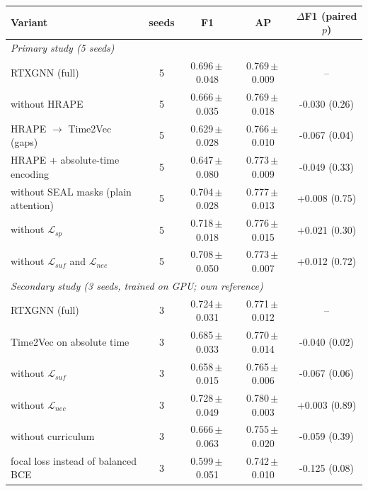 \begin{tabular}{lcccc}
\toprule
Variant & seeds & F1 & AP & $\Delta$F1 (paired $p$)\\
\midrule
\multicolumn{5}{l}{\textit{Primary study (5 seeds)}}\\
RTXGNN (full) & 5 & 0.696\,$\pm$\,0.048 & 0.769\,$\pm$\,0.009 & --\\
without HRAPE & 5 & 0.666\,$\pm$\,0.035 & 0.769\,$\pm$\,0.018 & -0.030 (0.26)\\
HRAPE $\rightarrow$ Time2Vec (gaps) & 5 & 0.629\,$\pm$\,0.028 & 0.766\,$\pm$\,0.010 & -0.067 (0.04)\\
HRAPE + absolute-time encoding & 5 & 0.647\,$\pm$\,0.080 & 0.773\,$\pm$\,0.009 & -0.049 (0.33)\\
without SEAL masks (plain attention) & 5 & 0.704\,$\pm$\,0.028 & 0.777\,$\pm$\,0.013 & +0.008 (0.75)\\
without $\mathcal{L}_{sp}$ & 5 & 0.718\,$\pm$\,0.018 & 0.776\,$\pm$\,0.015 & +0.021 (0.30)\\
without $\mathcal{L}_{suf}$ and $\mathcal{L}_{nec}$ & 5 & 0.708\,$\pm$\,0.050 & 0.773\,$\pm$\,0.007 & +0.012 (0.72)\\
\midrule\multicolumn{5}{l}{\textit{Secondary study (3 seeds, trained on GPU; own reference)}}\\
RTXGNN (full) & 3 & 0.724\,$\pm$\,0.031 & 0.771\,$\pm$\,0.012 & --\\
Time2Vec on absolute time & 3 & 0.685\,$\pm$\,0.033 & 0.770\,$\pm$\,0.014 & -0.040 (0.02)\\
without $\mathcal{L}_{suf}$ & 3 & 0.658\,$\pm$\,0.015 & 0.765\,$\pm$\,0.006 & -0.067 (0.06)\\
without $\mathcal{L}_{nec}$ & 3 & 0.728\,$\pm$\,0.049 & 0.780\,$\pm$\,0.003 & +0.003 (0.89)\\
without curriculum & 3 & 0.666\,$\pm$\,0.063 & 0.755\,$\pm$\,0.020 & -0.059 (0.39)\\
focal loss instead of balanced BCE & 3 & 0.599\,$\pm$\,0.051 & 0.742\,$\pm$\,0.010 & -0.125 (0.08)\\
\bottomrule
\end{tabular}
